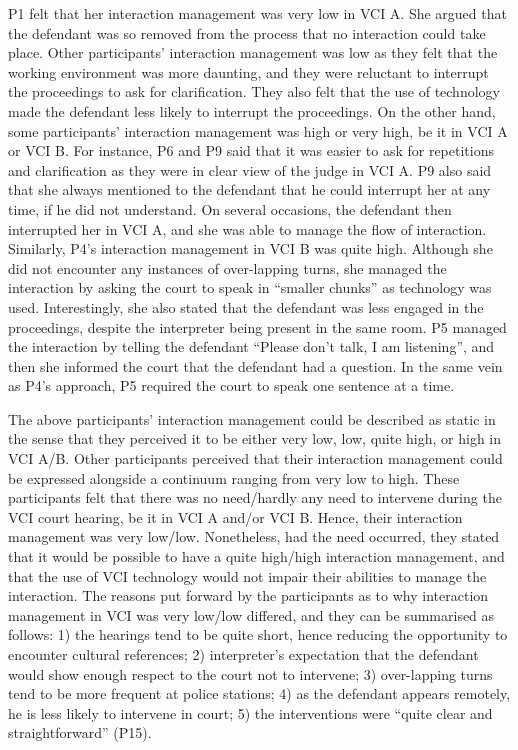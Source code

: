 \documentclass[output=paper]{langsci/langscibook}
\begin{document}
P1 felt that her interaction management was very low in VCI A. She argued that the defendant was so removed from the process that no interaction could take place. Other participants’ interaction management was low as they felt that the working environment was more daunting, and they were reluctant to interrupt the proceedings to ask for clarification. They also felt that the use of technology made the defendant less likely to interrupt the proceedings. On the other hand, some participants’ interaction management was high or very high, be it in VCI A or VCI B. For instance, P6 and P9 said that it was easier to ask for repetitions and clarification as they were in clear view of the judge in VCI A. P9 also said that she always mentioned to the defendant that he could interrupt her at any time, if he did not understand. On several occasions, the defendant then interrupted her in VCI A, and she was able to manage the flow of interaction. Similarly, P4’s interaction management in VCI B was quite high. Although she did not encounter any instances of over-lapping turns, she managed the interaction by asking the court to speak in “smaller chunks” as technology was used. Interestingly, she also stated that the defendant was less engaged in the proceedings, despite the interpreter being present in the same room. P5 managed the interaction by telling the defendant “Please don’t talk, I am listening”, and then she informed the court that the defendant had a question. In the same vein as P4’s approach, P5 required the court to speak one sentence at a time. 

The above participants’ interaction management could be described as static in the sense that they perceived it to be either very low, low, quite high, or high in VCI A/B. Other participants perceived that their interaction management could be expressed alongside a continuum ranging from very low to high. These participants felt that there was no need/hardly any need to intervene during the VCI court hearing, be it in VCI A and/or VCI B. Hence, their interaction management was very low/low. Nonetheless, had the need occurred, they stated that it would be possible to have a quite high/high interaction management, and that the use of VCI technology would not impair their abilities to manage the interaction. The reasons put forward by the participants as to why interaction management in VCI was very low/low differed, and they can be summarised as follows: 1) the hearings tend to be quite short, hence reducing the opportunity to encounter cultural references; 2) interpreter’s expectation that the defendant would show enough respect to the court not to intervene; 3) over-lapping turns tend to be more frequent at police stations; 4) as the defendant appears remotely, he is less likely to intervene in court; 5) the interventions were “quite clear and straightforward” (P15).
\end{document}
